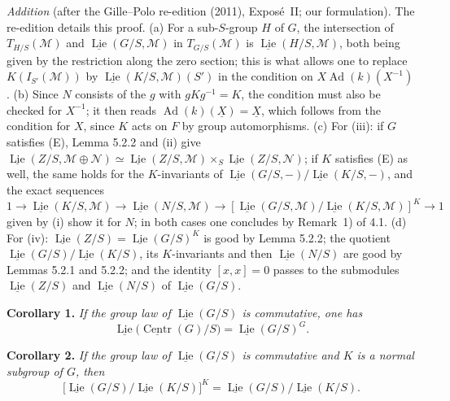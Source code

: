 \par\medskip\noindent
\emph{Addition} (after the Gille--Polo re-edition (2011), Expos\'e~II; our
formulation). The re-edition details this proof. (a) For a sub-\(S\)-group
\(H\) of \(G\), the intersection of \(T_{H/S}(\mathscr M)\) and
\(\underline{\operatorname{Lie}}(G/S,\mathscr M)\) in \(T_{G/S}(\mathscr M)\)
is \(\underline{\operatorname{Lie}}(H/S,\mathscr M)\), both being given by
the restriction along the zero section; this is what allows one to replace
\(K(I_{S'}(\mathscr M))\) by \(\underline{\operatorname{Lie}}(K/S,\mathscr M)(S')\)
in the condition on \(X\operatorname{Ad}(k)(X^{-1})\). (b) Since \(N\)
consists of the \(g\) with \(gKg^{-1}=K\), the condition must also be
checked for \(X^{-1}\); it then reads
\(\operatorname{Ad}(k)(\underline X)=\underline X\), which follows from
the condition for \(X\), since \(K\) acts on \(F\) by group
automorphisms. (c) For (iii): if \(G\) satisfies (E), Lemma 5.2.2 and (ii)
give \(\underline{\operatorname{Lie}}(Z/S,\mathscr M\oplus\mathscr N)\simeq
\underline{\operatorname{Lie}}(Z/S,\mathscr M)\times_S
\underline{\operatorname{Lie}}(Z/S,\mathscr N)\); if \(K\) satisfies (E) as
well, the same holds for the \(K\)-invariants of
\(\underline{\operatorname{Lie}}(G/S,-)/\underline{\operatorname{Lie}}(K/S,-)\),
and the exact sequences
\(1\to\underline{\operatorname{Lie}}(K/S,\mathscr M)\to
\underline{\operatorname{Lie}}(N/S,\mathscr M)\to
[\underline{\operatorname{Lie}}(G/S,\mathscr M)/\underline{\operatorname{Lie}}(K/S,\mathscr M)]^K\to1\)
given by (i) show it for \(N\); in both cases one concludes by Remark~1)
of 4.1. (d) For (iv): \(\underline{\operatorname{Lie}}(Z/S)=
\underline{\operatorname{Lie}}(G/S)^K\) is good by Lemma 5.2.2; the
quotient \(\underline{\operatorname{Lie}}(G/S)/\underline{\operatorname{Lie}}(K/S)\),
its \(K\)-invariants and then \(\underline{\operatorname{Lie}}(N/S)\) are
good by Lemmas 5.2.1 and 5.2.2; and the identity \([x,x]=0\) passes to the
submodules \(\underline{\operatorname{Lie}}(Z/S)\) and
\(\underline{\operatorname{Lie}}(N/S)\) of
\(\underline{\operatorname{Lie}}(G/S)\).
\par\medskip

\medskip
\noindent{}\textbf{Corollary 1.}
\textit{If the group law of \(\underline{\operatorname{Lie}}(G/S)\) is
commutative, one has}
\[
 \underline{\operatorname{Lie}}
   \bigl(\underline{\operatorname{Centr}}(G)/S\bigr)
 =\underline{\operatorname{Lie}}(G/S)^G.
\]

\medskip
\noindent{}\textbf{Corollary 2.}
\textit{If the group law of \(\underline{\operatorname{Lie}}(G/S)\) is
commutative and \(K\) is a normal subgroup of \(G\), then}
\[
 \bigl[\underline{\operatorname{Lie}}(G/S)/
 \underline{\operatorname{Lie}}(K/S)\bigr]^K
 =
 \underline{\operatorname{Lie}}(G/S)/
 \underline{\operatorname{Lie}}(K/S).
\]

